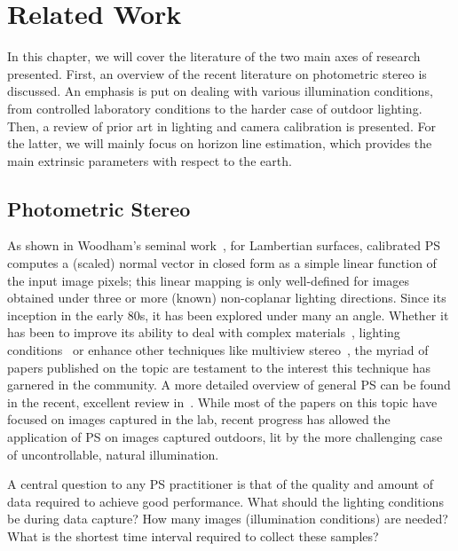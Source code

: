 \chapter{Related Work}

In this chapter, we will cover the literature of the two main axes of research presented. First, an overview of the recent literature on photometric stereo is discussed. An emphasis is put on dealing with various illumination conditions, from controlled laboratory conditions to the harder case of outdoor lighting. Then, a review of prior art in lighting and camera calibration is presented. For the latter, we will mainly focus on horizon line estimation, which provides the main extrinsic parameters with respect to the earth.


\section{Photometric Stereo}


As shown in Woodham's seminal work~\cite{woodham-opteng-80}, for Lambertian surfaces, calibrated PS computes a (scaled) normal vector in closed form as a simple linear function of the input image pixels; this linear mapping is only well-defined for images obtained under three or more (known) non-coplanar lighting directions. 
Since its inception in the early 80s, it has been explored under many an angle. Whether it has been to improve its ability to deal with complex materials~\cite{alldrin-cvpr-08}, lighting conditions~\cite{alldrin-cvpr-08,basri-ijcv-07,johnson-cvpr-11,oxholm-eccv-12} or enhance other techniques like multiview stereo~\cite{snavely-ijcv-08}, the myriad of papers published on the topic are testament to the interest this technique has garnered in the community. A more detailed overview of general PS can be found in the recent, excellent review in~\cite{shi-tpami-18}. While most of the papers on this topic have focused on images captured in the lab, recent progress has allowed the application of PS on images captured outdoors, lit by the more challenging case of uncontrollable, natural illumination. 

A central question to any PS practitioner is that of the quality and amount of data required to achieve good performance. What should the lighting conditions be during data capture? How many images (illumination conditions) are needed? What is the shortest time interval required to collect these samples? 

